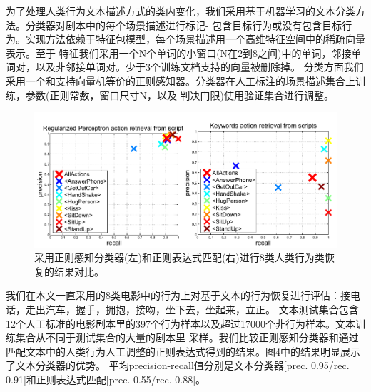 \documentclass[10pt,twocolumn,letterpaper]{article}
\begin{document}
为了处理人类行为文本描述方式的类内变化，我们采用基于机器学习的文本分类方法\cite{16}。分类器对剧本中的每个场景描述进行标记-
包含目标行为或没有包含目标行为。实现方法依赖于特征包模型，每个场景描述用一个高维特征空间中的稀疏向量表示。至于
特征我们采用一个N个单词的小窗口(N在2到8之间)中的单词，邻接单词对，以及非邻接单词对。少于3个训练文档支持的向量被删除掉。
分类方面我们采用一个和支持向量机等价的正则感知器\cite{21}。分类器在人工标注的场景描述集合上训练，参数(正则常数，窗口尺寸N，以及
判决门限)使用验证集合进行调整。

\begin{figure}[h]
\begin{center}
   \includegraphics[width=1.0\linewidth]{fig4.png}
\end{center}
   \caption{
		   采用正则感知分类器(左)和正则表达式匹配(右)进行8类人类行为类恢复的结果对比。
   }
\end{figure}

我们在本文一直采用的8类电影中的行为上对基于文本的行为恢复进行评估：接电话，走出汽车，握手，拥抱，接吻，坐下去，坐起来，立正。
文本测试集合包含12个人工标准的电影剧本里的397个行为样本以及超过17000个非行为样本。文本训练集合从不同于测试集合的大量的剧本里
采样。我们比较正则感知分类器和通过匹配文本中的人类行为人工调整的正则表达式得到的结果。图4中的结果明显展示了文本分类器的优势。
平均precision-recall值分别是文本分类器[prec. 0.95/rec. 0.91]和正则表达式匹配[prec. 0.55/rec. 0.88]。
\end{document}
